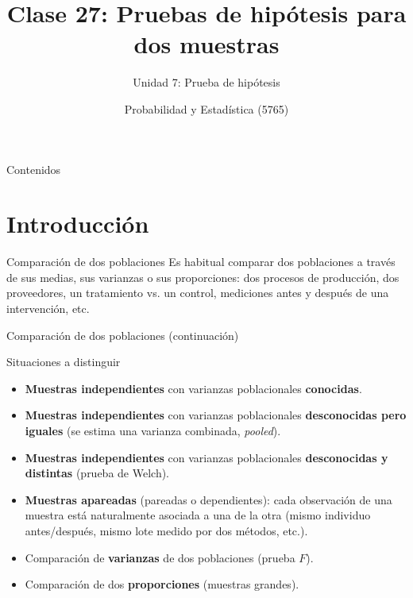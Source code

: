 \documentclass[aspectratio=169,11pt]{beamer}
\title[Prob. y Estadística]{Clase 27: Pruebas de hipótesis para dos muestras}
\subtitle{Unidad 7: Prueba de hipótesis}
\institute[UNS]{Universidad Nacional del Sur \\ Departamento de Matemática}
\author{Probabilidad y Estadística (5765)}
\date{}
\begin{document}
\begin{frame}
\titlepage
\end{frame}

\begin{frame}{Contenidos}
\tableofcontents
\end{frame}

\section{Introducción}

\begin{frame}{Comparación de dos poblaciones}
Es habitual comparar dos poblaciones a través de sus medias, sus varianzas o sus proporciones: dos procesos de producción, dos proveedores, un tratamiento vs. un control, mediciones antes y después de una intervención, etc.

\end{frame}

\begin{frame}{Comparación de dos poblaciones (continuación)}
\begin{block}{Situaciones a distinguir}
\begin{itemize}
\item \textbf{Muestras independientes} con varianzas poblacionales \textbf{conocidas}.
\item \textbf{Muestras independientes} con varianzas poblacionales \textbf{desconocidas pero iguales} (se estima una varianza combinada, \emph{pooled}).
\item \textbf{Muestras independientes} con varianzas poblacionales \textbf{desconocidas y distintas} (prueba de Welch).
\item \textbf{Muestras apareadas} (pareadas o dependientes): cada observación de una muestra está naturalmente asociada a una de la otra (mismo individuo antes/después, mismo lote medido por dos métodos, etc.).
\item Comparación de \textbf{varianzas} de dos poblaciones (prueba $F$).
\item Comparación de dos \textbf{proporciones} (muestras grandes).
\end{itemize}
\end{block}
\end{frame}
\end{document}
